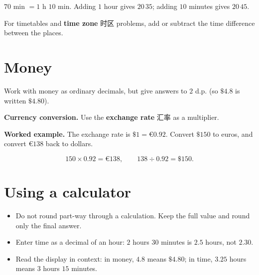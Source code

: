 \documentclass[11pt]{article}
\begin{document}
$70$ min $= 1$ h $10$ min. Adding $1$ hour gives $20\,35$; adding $10$ minutes gives $20\,45$.

For timetables and \textbf{time zone} 时区 problems, add or subtract the time difference between the places.

\section*{Money}

Work with money as ordinary decimals, but give answers to $2$ d.p. (so $\$4.8$ is written $\$4.80$).

\textbf{Currency conversion.} Use the \textbf{exchange rate} 汇率 as a multiplier.

\textbf{Worked example.} The exchange rate is $\$1 = €0.92$. Convert $\$150$ to euros, and convert $€138$ back to dollars.

\[
150 \times 0.92 = €138, \qquad 138 \div 0.92 = \$150.
\]

\section*{Using a calculator}

\begin{itemize}
\item Do not round part-way through a calculation. Keep the full value and round only the final answer.

\item Enter time as a decimal of an hour: $2$ hours $30$ minutes is $2.5$ hours, not $2.30$.

\item Read the display in context: in money, $4.8$ means $\$4.80$; in time, $3.25$ hours means $3$ hours $15$ minutes.

\end{itemize}
\end{document}

